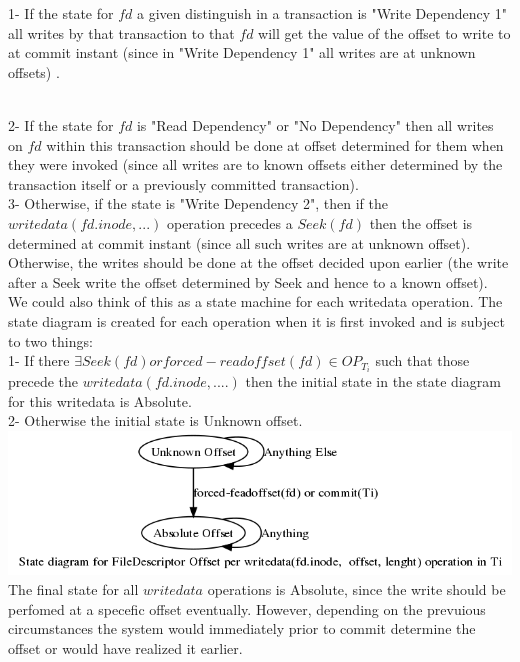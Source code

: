 \documentclass[a4paper, 11pt]{article}
\begin{document}
1- If the state for $fd$ a given distinguish in a transaction is "Write Dependency 1" all writes by that transaction to that $fd$ will get the value of the offset to write to at commit instant (since in "Write Dependency 1" all writes are at unknown offsets) .\\\

2- If the state for $fd$ is "Read Dependency"  or "No Dependency" then all writes on $fd$ within this transaction should be done at offset determined for them when they were invoked (since all writes are to known offsets either determined by the transaction itself or a previously committed transaction).\\

3- Otherwise, if the state is "Write Dependency 2", then if the $writedata(fd.inode,...)$ operation precedes a $Seek(fd)$ then the offset is determined at commit instant (since all such writes are at unknown offset). Otherwise, the writes should be done at the offset decided upon earlier (the write after a Seek write the offset determined by Seek and hence to a known offset).\\


We could also think of this as a state machine for each writedata operation. The state diagram is created for each operation when it is first invoked and is subject to two things:\\

1- If there $\exists Seek(fd) or forced-readoffset(fd)\in OP_{T_i}$ such that those precede the $writedata(fd.inode,....)$ then the initial state in the state diagram for this writedata is Absolute.\\

2- Otherwise the initial state is Unknown offset.\\

\includegraphics[scale = 0.3]{hello2.png}\\

The final state for all $writedata$ operations is Absolute, since the write should be perfomed at a specefic offset eventually. However, depending on the prevuious circumstances the system would immediately prior to commit determine the offset or would have realized it earlier.\\ 
\end{document}
